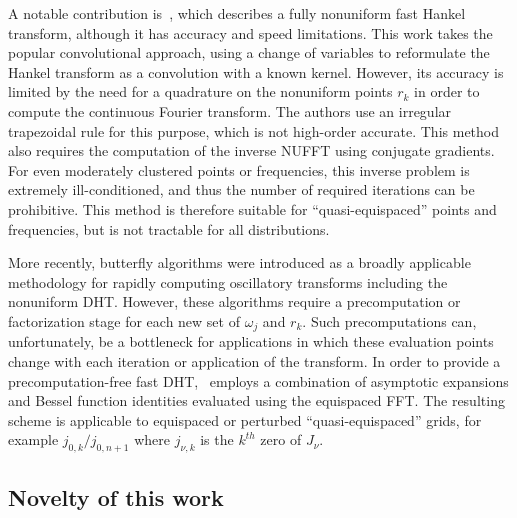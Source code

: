 A notable contribution is~\cite{liu1999nonuniform}, which describes a fully
nonuniform fast Hankel transform, although it has accuracy and speed
limitations. This work takes the popular convolutional approach, using a change
of variables to reformulate the Hankel transform as a convolution with a known
kernel. However, its accuracy is limited by the need for a quadrature on the
nonuniform points $r_k$ in order to compute the continuous Fourier transform.
The authors use an irregular trapezoidal rule for this purpose, which is not
high-order accurate. This method also requires the computation of the inverse
NUFFT using conjugate gradients. For even moderately clustered points or
frequencies, this inverse problem is extremely ill-conditioned, and thus the
number of required iterations can be prohibitive. This method is therefore
suitable for ``quasi-equispaced'' points and frequencies, but is not tractable
for all distributions.

More recently, butterfly algorithms \cite{oneil2010algorithm, li2015butterfly,
pang2020interpolative} were introduced as a broadly applicable methodology for
rapidly computing oscillatory transforms including the nonuniform DHT. However,
these algorithms require a precomputation or factorization stage for each new
set of $\omega_j$ and $r_k$. Such precomputations can, unfortunately, be a
bottleneck for applications in which these evaluation points change with each
iteration or application of the transform. In order to provide a
precomputation-free fast DHT,~\cite{townsend2015fast} employs a combination of
asymptotic expansions and Bessel function identities evaluated using the
equispaced FFT. The resulting scheme is applicable to equispaced or perturbed
``quasi-equispaced'' grids, for example $j_{0,k} / j_{0,n+1}$ where $j_{\nu,k}$
is the $k^{th}$ zero of $J_\nu$.

\subsection*{Novelty of this work}
\label{sec:novelty}


